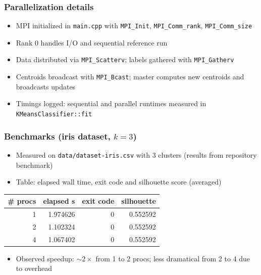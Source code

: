 \documentclass{beamer}
\begin{document}
\begin{frame}\frametitle{Parallelization details}
    \begin{itemize}
        \item MPI initialized in \texttt{main.cpp} with \texttt{MPI\_Init}, \texttt{MPI\_Comm\_rank}, \texttt{MPI\_Comm\_size}
        \item Rank 0 handles I/O and sequential reference run
        \item Data distributed via \texttt{MPI\_Scatterv}; labels gathered with \texttt{MPI\_Gatherv}
        \item Centroids broadcast with \texttt{MPI\_Bcast}; master computes new centroids and broadcasts updates
        \item Timings logged: sequential and parallel runtimes measured in \texttt{KMeansClassifier::fit}
    \end{itemize}
\end{frame}

\begin{frame}\frametitle{Benchmarks (iris dataset, $k=3$)}
    \begin{itemize}
        \item Measured on \texttt{data/dataset-iris.csv} with 3 clusters (results from repository benchmark)
        \item Table: elapsed wall time, exit code and silhouette score (averaged)
    \end{itemize}
    \vspace{3mm}
    \begin{center}
        \begin{tabular}{r r r r}
            \hline
            \# procs & elapsed s & exit code & silhouette \\
            \hline
            1        & 1.974626  & 0         & 0.552592   \\
            2        & 1.102324  & 0         & 0.552592   \\
            4        & 1.067402  & 0         & 0.552592   \\
            \hline
        \end{tabular}
    \end{center}
    \vspace{2mm}
    \begin{itemize}
        \item Observed speedup: $\sim 2\times$ from 1 to 2 procs; less dramatical from 2 to 4 due to overhead
    \end{itemize}
\end{frame}
\end{document}
